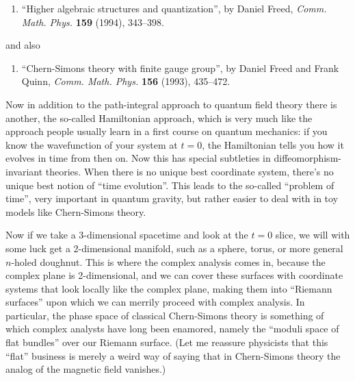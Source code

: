 \documentclass{article}
\def\tightlist{}
\begin{document}
\begin{enumerate}
\def\labelenumi{\arabic{enumi})}
\setcounter{enumi}{1}
\tightlist
\item
  ``Higher algebraic structures and quantization'', by Daniel Freed,
  \emph{Comm. Math. Phys.} \textbf{159} (1994), 343--398.
\end{enumerate}

and also

\begin{enumerate}
\def\labelenumi{\arabic{enumi})}
\setcounter{enumi}{2}
\tightlist
\item
  ``Chern-Simons theory with finite gauge group'', by Daniel Freed and
  Frank Quinn, \emph{Comm. Math. Phys.} \textbf{156} (1993), 435--472.
\end{enumerate}

Now in addition to the path-integral approach to quantum field theory
there is another, the so-called Hamiltonian approach, which is very much
like the approach people usually learn in a first course on quantum
mechanics: if you know the wavefunction of your system at \(t = 0\), the
Hamiltonian tells you how it evolves in time from then on. Now this has
special subtleties in diffeomorphism-invariant theories. When there is
no unique best coordinate system, there's no unique best notion of
``time evolution''. This leads to the so-called ``problem of time'',
very important in quantum gravity, but rather easier to deal with in toy
models like Chern-Simons theory.

Now if we take a 3-dimensional spacetime and look at the \(t = 0\)
slice, we will with some luck get a 2-dimensional manifold, such as a
sphere, torus, or more general \(n\)-holed doughnut. This is where the
complex analysis comes in, because the complex plane is 2-dimensional,
and we can cover these surfaces with coordinate systems that look
locally like the complex plane, making them into ``Riemann surfaces''
upon which we can merrily proceed with complex analysis. In particular,
the phase space of classical Chern-Simons theory is something of which
complex analysts have long been enamored, namely the ``moduli space of
flat bundles'' over our Riemann surface. (Let me reassure physicists
that this ``flat'' business is merely a weird way of saying that in
Chern-Simons theory the analog of the magnetic field vanishes.)
\end{document}
